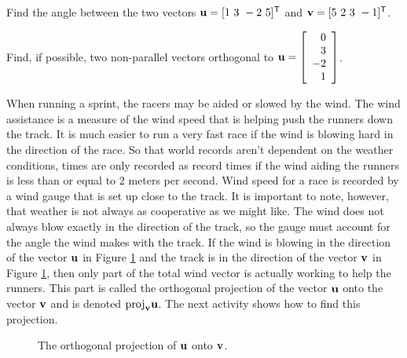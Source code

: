 \begin{activity} \hfill
	\ba
	\item Find the angle between the two vectors $\mathbf{u} = [1 \ 3 \ -2 \ 5]^{\mathsf{T}}$ and $\mathbf{v} = [5 \  2 \  3  \ -1]^{\mathsf{T}}$.
	
	
	
	\item Find, if possible, two non-parallel vectors orthogonal to $\mathbf{u} = \left[ \begin{array}{r} 0\\3\\-2\\1 \end{array} \right]$.
	
	
	
	\ea
\end{activity}

\label{sec:orthog_proj}

When running a sprint, the racers may be aided or slowed by the wind. The wind assistance is a measure of the wind speed that is helping push the runners down the track. It is much easier to run a very fast race if the wind is blowing hard in the direction of the race. So that world records aren't dependent on the weather conditions, times are only recorded as record times if the wind aiding the runners is less than or equal to 2 meters per second. Wind speed for a race is recorded by a wind gauge that is set up close to the track. It is important to note, however, that weather is not always as cooperative as we might like. The wind does not always blow exactly in the direction of the track, so the gauge must account for the angle the wind makes with the track. If the wind is blowing in the direction of the vector $\mathbf{u}$ in Figure \ref{F:Projection} and the track is in the direction of the vector $\mathbf{v}$ in Figure \ref{F:Projection}, then only part of the total wind vector is actually working to help the runners. This part is called the orthogonal projection of the vector $\mathbf{u}$ onto the vector $\mathbf{v}$ and is denoted $\text{proj}_{\mathbf{v}} \mathbf{u}$. The next activity shows how to find this projection.

\begin{figure}[h]
\begin{center}
\end{center}
\caption{The orthogonal projection of $\mathbf{u}$ onto $\mathbf{v}$.}
\label{F:Projection}
\end{figure}

